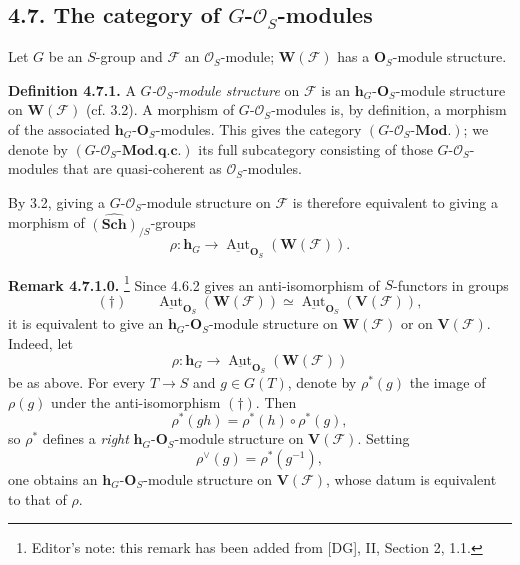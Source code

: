 \subsection*{4.7. The category of \(G\)-\(\mathcal O_S\)-modules}

Let \(G\) be an \(S\)-group and \(\mathscr F\) an
\(\mathcal O_S\)-module; \(\mathbf W(\mathscr F)\) has a
\(\mathbf O_S\)-module structure.

\medskip
\noindent\textbf{Definition 4.7.1.}
A \emph{\(G\)-\(\mathcal O_S\)-module structure} on \(\mathscr F\) is
an \(\mathbf h_G\)-\(\mathbf O_S\)-module structure on
\(\mathbf W(\mathscr F)\) (cf. 3.2). A morphism of
\(G\)-\(\mathcal O_S\)-modules is, by definition, a morphism of the
associated \(\mathbf h_G\)-\(\mathbf O_S\)-modules. This gives the
category \((G\text{-}\mathcal O_S\text{-}\mathbf{Mod.})\); we denote by
\((G\text{-}\mathcal O_S\text{-}\mathbf{Mod.q.c.})\) its full
subcategory consisting of those \(G\)-\(\mathcal O_S\)-modules that are
quasi-coherent as \(\mathcal O_S\)-modules.

By 3.2, giving a \(G\)-\(\mathcal O_S\)-module structure on
\(\mathscr F\) is therefore equivalent to giving a morphism of
\(\widehat{(\mathbf{Sch})}_{/S}\)-groups
\[
  \rho:\mathbf h_G\longrightarrow
    \underline{\operatorname{Aut}}_{\mathbf O_S}
      (\mathbf W(\mathscr F)).
\]

\medskip
\noindent\textbf{Remark 4.7.1.0.}
\footnote{Editor's note: this remark has been added from [DG], II,
Section 2, 1.1.}
Since 4.6.2 gives an anti-isomorphism of \(S\)-functors in groups
\[
  (\dagger)\qquad
  \underline{\operatorname{Aut}}_{\mathbf O_S}
    (\mathbf W(\mathscr F))
  \simeq
  \underline{\operatorname{Aut}}_{\mathbf O_S}
    (\mathbf V(\mathscr F)),
\]
it is equivalent to give an \(\mathbf h_G\)-\(\mathbf O_S\)-module
structure on \(\mathbf W(\mathscr F)\) or on \(\mathbf V(\mathscr F)\).
Indeed, let
\[
  \rho:\mathbf h_G\longrightarrow
  \underline{\operatorname{Aut}}_{\mathbf O_S}
    (\mathbf W(\mathscr F))
\]
be as above. For every \(T\to S\) and \(g\in G(T)\), denote by
\(\rho^*(g)\) the image of \(\rho(g)\) under the anti-isomorphism
\((\dagger)\). Then
\[
  \rho^*(gh)=\rho^*(h)\circ\rho^*(g),
\]
so \(\rho^*\) defines a \emph{right}
\(\mathbf h_G\)-\(\mathbf O_S\)-module structure on
\(\mathbf V(\mathscr F)\). Setting
\[
  \rho^{\vee}(g)=\rho^*(g^{-1}),
\]
one obtains an \(\mathbf h_G\)-\(\mathbf O_S\)-module structure on
\(\mathbf V(\mathscr F)\), whose datum is equivalent to that of
\(\rho\).

